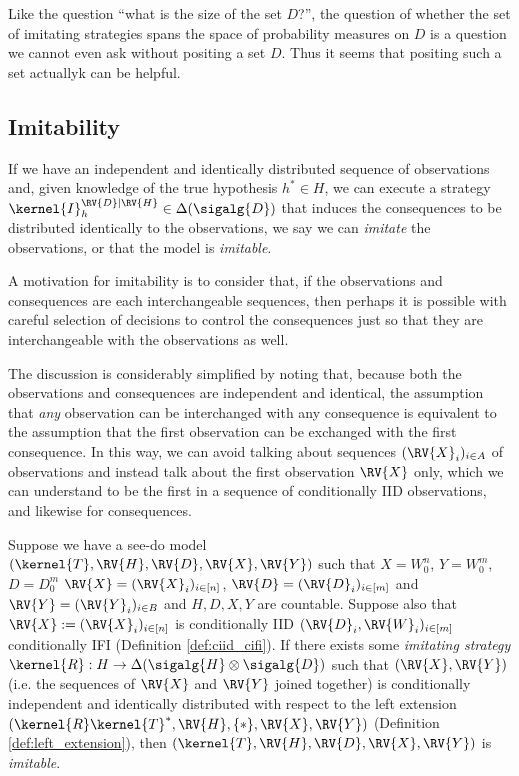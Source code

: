 Like the question ``what is the size of the set $D$?'', the question of whether the set of imitating strategies spans the space of probability measures on $D$ is a question we cannot even ask without positing a set $D$. Thus it seems that positing such a set actuallyk can be helpful.

\subsection{Imitability}

If we have an independent and identically distributed sequence of observations and, given knowledge of the true hypothesis $h^*\in H$, we can execute a strategy $\kernel{I}^{\RV{D}|\RV{H}}_h\in \Delta(\sigalg{D})$ that induces the consequences to be distributed identically to the observations, we say we can \emph{imitate} the observations, or that the model is \emph{imitable}.

A motivation for imitability is to consider that, if the observations and consequences are each interchangeable sequences, then perhaps it is possible with careful selection of decisions to control the consequences just so that they are interchangeable with the observations as well. 

The discussion is considerably simplified by noting that, because both the observations and consequences are independent and identical, the assumption that \emph{any} observation can be interchanged with any consequence is equivalent to the assumption that the first observation can be exchanged with the first consequence. In this way, we can avoid talking about sequences $(\RV{X}_i)_{i\in A}$ of observations and instead talk about the first observation $\RV{X}$ only, which we can understand to be the first in a sequence of conditionally IID observations, and likewise for consequences.

\begin{definition}[Imitability]
Suppose we have a see-do model $(\kernel{T},\RV{H},\RV{D},\RV{X},\RV{Y})$ such that $X=W_0^{n}$, $Y=W_0^{m}$, $D=D_0^{m}$ $\RV{X}=(\RV{X}_i)_{i\in [n]}$, $\RV{D}=(\RV{D}_i)_{i\in [m]}$ and $\RV{Y}=(\RV{Y}_i)_{i\in B}$ and $H,D,X,Y$ are countable. Suppose also that $\RV{X}:=(\RV{X}_i)_{i\in [n]}$ is conditionally IID $(\RV{D}_i,\RV{W}_i)_{i\in[m]}$ conditionally IFI (Definition \ref{def:ciid_cifi}). If there exists some \emph{imitating strategy} $\kernel{R}:H\to\Delta(\sigalg{H}\otimes\sigalg{D})$ such that $(\RV{X},\RV{Y})$ (i.e. the sequences of $\RV{X}$ and $\RV{Y}$ joined together) is conditionally independent and identically distributed with respect to  the left extension $(\kernel{R}\kernel{T}^*,\RV{H},\{*\},\RV{X},\RV{Y})$ (Definition \ref{def:left_extension}), then $(\kernel{T},\RV{H},\RV{D},\RV{X},\RV{Y})$ is \emph{imitable}.
\end{definition}


